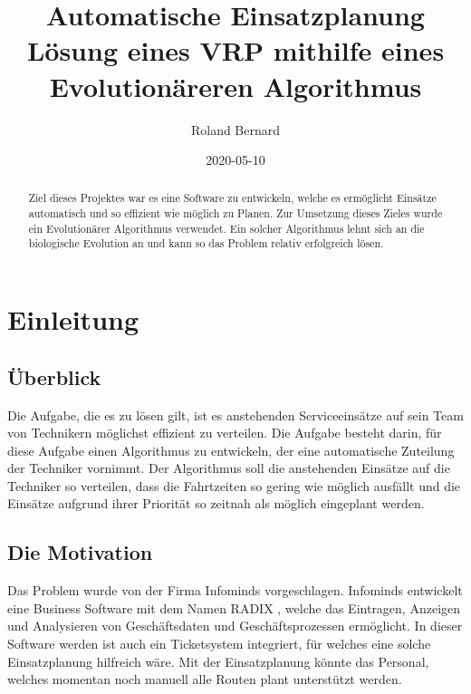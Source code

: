 \documentclass[a4paper,notitlepage,12pt]{report}
\title{Automatische Einsatzplanung \\
    \large Lösung eines VRP mithilfe eines Evolutionäreren Algorithmus}
\author{Roland Bernard}
\date{2020-05-10}
\begin{document}
\maketitle
\begin{abstract}

    Ziel dieses Projektes war es eine Software zu entwickeln, welche es 
    ermöglicht Einsätze automatisch und so effizient wie möglich zu Planen.
    Zur Umsetzung dieses Zieles wurde ein Evolutionärer Algorithmus verwendet.
    Ein solcher Algorithmus lehnt sich an die biologische Evolution an und
    kann so das Problem relativ erfolgreich lösen.

\end{abstract}
\newpage

\tableofcontents
\newpage
{}
\listoffigures
\newpage
{}
\listoftables
\newpage
{}
\printnomenclature
\newpage

\chapter{Einleitung}

\section{Überblick}

Die Aufgabe, die es zu lösen gilt, ist es anstehenden Serviceeinsätze auf sein
Team von Technikern möglichst effizient zu verteilen. Die Aufgabe besteht
darin, für diese Aufgabe einen Algorithmus zu entwickeln, der eine automatische
Zuteilung der Techniker vornimmt. Der Algorithmus soll die anstehenden Einsätze
auf die Techniker so verteilen, dass die Fahrtzeiten so gering wie möglich ausfällt
und die Einsätze aufgrund ihrer Priorität so zeitnah als möglich eingeplant werden.

\section{Die Motivation}

Das Problem wurde von der Firma Infominds vorgeschlagen. Infominds entwickelt eine
Business Software mit dem Namen RADIX \cite{radix}, welche das Eintragen, Anzeigen und Analysieren
von Geschäftsdaten und Geschäftsprozessen ermöglicht. In dieser Software werden
ist auch ein Ticketsystem integriert, für welches eine solche Einsatzplanung
hilfreich wäre. Mit der Einsatzplanung könnte das Personal, welches momentan noch
manuell alle Routen plant unterstützt werden.
\end{document}

